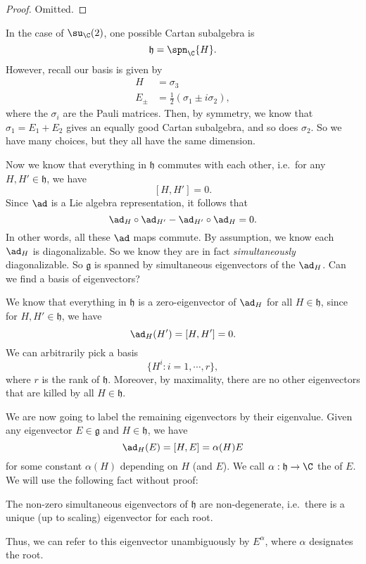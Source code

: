 \documentclass[a4paper]{article}
\begin{document}
\begin{proof}
  Omitted. %
\end{proof}


\begin{eg}
  In the case of $\su_\C(2)$, one possible Cartan subalgebra is
  \[
    \mathfrak{h} = \spn_\C \{H\}.
  \]
  However, recall our basis is given by
  \begin{align*}
    H &= \sigma_3\\
    E_{\pm} &= \frac{1}{2}(\sigma_1 \pm i \sigma_2),
  \end{align*}
  where the $\sigma_i$ are the Pauli matrices. Then, by symmetry, we know that $\sigma_1 = E_1 + E_2$ gives an equally good Cartan subalgebra, and so does $\sigma_2$. So we have many choices, but they all have the same dimension.
\end{eg}

Now we know that everything in $\mathfrak{h}$ commutes with each other, i.e.\ for any $H, H' \in \mathfrak{h}$, we have
\[
  [H, H'] = 0.
\]
Since $\ad$ is a Lie algebra representation, it follows that
\[
  \ad_{H} \circ \ad_{H'} - \ad_{H'} \circ \ad_H = 0.
\]
In other words, all these $\ad$ maps commute. By assumption, we know each $\ad_H$ is diagonalizable. So we know they are in fact \emph{simultaneously} diagonalizable. So $\mathfrak{g}$ is spanned by simultaneous eigenvectors of the $\ad_H$. Can we find a basis of eigenvectors?

We know that everything in $\mathfrak{h}$ is a zero-eigenvector of $\ad_H$ for all $H \in \mathfrak{h}$, since for $H, H' \in\mathfrak{h}$, we have
\[
  \ad_{H}(H') = [H, H'] = 0.
\]
We can arbitrarily pick a basis
\[
  \{H^i: i = 1, \cdots, r\},
\]
where $r$ is the rank of $\mathfrak{h}$. Moreover, by maximality, there are no other eigenvectors that are killed by all $H \in \mathfrak{h}$.

We are now going to label the remaining eigenvectors by their eigenvalue. Given any eigenvector $E \in \mathfrak{g}$ and $H \in \mathfrak{h}$, we have
\[
  \ad_H(E) = [H, E] = \alpha(H) E
\]
for some constant $\alpha(H)$ depending on $H$ (and $E$). We call $\alpha: \mathfrak{h} \to \C$ the  of $E$. We will use the following fact without proof:
\begin{fact}
  The non-zero simultaneous eigenvectors of $\mathfrak{h}$ are non-degenerate, i.e.\ there is a unique (up to scaling) eigenvector for each root.
\end{fact}
Thus, we can refer to this eigenvector unambiguously by $E^\alpha$, where $\alpha$ designates the root.
\end{document}
